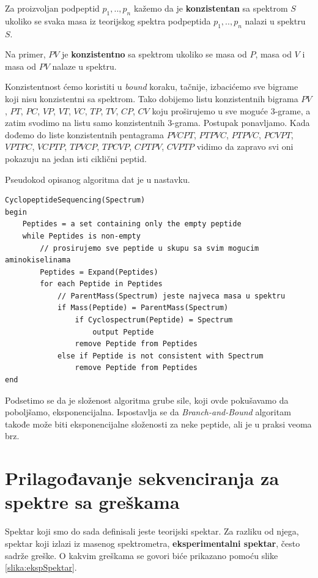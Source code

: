 \begin{definicija}
Za proizvoljan podpeptid $p_{1},..,p_{n}$ kažemo da je \textbf{konzistentan} sa spektrom $S$ ukoliko se svaka masa iz teorijskog spektra podpeptida  $p_{1},..,p_{n}$ nalazi u spektru $S$.
\end{definicija}

Na primer, $PV$ je \textbf{konzistentno} sa spektrom ukoliko se masa od $P$, masa od $V$ i masa od $PV$ nalaze u spektru.

Konzistentnost ćemo koristiti u \textit{bound} koraku, tačnije, izbacićemo sve bigrame koji nisu konzistentni sa spektrom. Tako dobijemo listu konzistentnih bigrama $PV$, $PT$, $PC$, $VP$, $VT$, $VC$, $TP$, $TV$, $CP$, $CV$ koju proširujemo u sve moguće $3$-grame, a zatim svodimo na listu samo konzistentnih $3$-grama. Postupak ponavljamo. Kada dođemo do liste konzistentnih pentagrama $PVCPT$, $PTPVC$, $PTPVC$, $PCVPT$, $VPTPC$, $VCPTP$, $TPVCP$, $TPCVP$, $CPTPV$, $CVPTP$ vidimo da zapravo svi oni pokazuju na jedan isti ciklični peptid.

Pseudokod opisanog algoritma dat je u nastavku.
\begin{lstlisting}
CyclopeptideSequencing(Spectrum)
begin
	Peptides = a set containing only the empty peptide
	while Peptides is non-empty
		// prosirujemo sve peptide u skupu sa svim mogucim aminokiselinama
		Peptides = Expand(Peptides)
		for each Peptide in Peptides
			// ParentMass(Spectrum) jeste najveca masa u spektru
			if Mass(Peptide) = ParentMass(Spectrum)
				if Cyclospectrum(Peptide) = Spectrum
					output Peptide
				remove Peptide from Peptides
			else if Peptide is not consistent with Spectrum
				remove Peptide from Peptides
end
\end{lstlisting}

Podsetimo se da je složenost algoritma grube sile, koji ovde pokušavamo da poboljšamo, eksponencijalna. Ispostavlja se da \textit{Branch-and-Bound} algoritam takođe može biti eksponencijalne složenosti za neke peptide, ali je u praksi veoma brz.



\section{Prilagođavanje sekvenciranja za spektre sa greškama} \label{greskeSpektri}

Spektar koji smo do sada definisali jeste teorijski spektar. Za razliku od njega, spektar koji izlazi iz masenog spektrometra, \textbf{eksperimentalni spektar}, često sadrže greške. O kakvim greškama se govori biće prikazano pomoću slike \ref{slika:ekspSpektar}.

